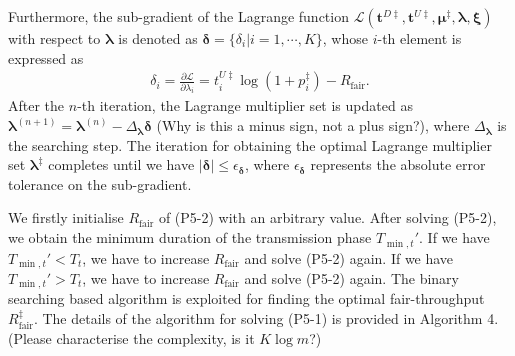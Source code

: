 \documentclass[12pt,draft,onecolumn,journal]{IEEEtran}
\begin{document}
Furthermore, the sub-gradient of the Lagrange function $\mathcal{L}(\mathbf{t}^{D\ddagger},\mathbf{t}^{U\ddagger},\boldsymbol{\mu}^{\ddagger},\boldsymbol{\lambda},\boldsymbol{\xi})$ with respect to $\boldsymbol{\lambda}$ is denoted as $\boldsymbol{\delta} = \{\delta_i| i=1,\cdots,K\}$, whose $i$-th element is expressed as
\begin{align}
	\delta_i = \frac{\partial\mathcal{L}}{\partial \lambda_i} = t_i^{U\ddagger} \log(1+p_i^{\ddagger}) - R_{\text{fair}}. \label{eq:fair-sg}
\end{align}
After the $n$-th iteration, the Lagrange multiplier set is updated as $\boldsymbol{\lambda}^{(n+1)} = \boldsymbol{\lambda}^{(n)} - \Delta_{\boldsymbol{\lambda}} \boldsymbol{\delta}$ {\color{red} (Why is this a minus sign, not a plus sign?)}, where $\Delta_{\boldsymbol{\lambda}}$ is the searching step. The iteration for obtaining the optimal Lagrange multiplier set $\boldsymbol{\lambda}^{\ddagger}$ completes until we have $|\boldsymbol{\delta}| \leq \epsilon_{\boldsymbol{\delta}}$, where $\epsilon_{\boldsymbol{\delta}}$ represents the absolute error tolerance on the sub-gradient.  

We firstly initialise $R_{\text{fair}}$ of (P5-2) with an arbitrary value. After solving (P5-2), we obtain the minimum duration of the transmission phase $T_{\min, t}'$. If we have $T_{\min, t}' < T_t$, we have to increase $R_{\text{fair}}$ and solve (P5-2) again.  If we have $T_{\min, t}' > T_t$, we have to increase $R_{\text{fair}}$ and solve (P5-2) again. The binary searching based algorithm is exploited for finding the optimal fair-throughput $R_{\text{fair}}^{\ddagger}$. The details of the algorithm for solving (P5-1) is provided in Algorithm 4. {\color{red} (Please characterise the complexity, is it $K\log m$?)}
\end{document}
